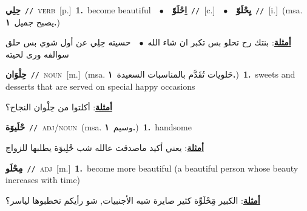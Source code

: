 \documentclass[10pt,a4paper,twoside]{article} %
\begin{document}
\begin{multicols}{2}
{\setlength\topsep{0pt}\textbf{\foreignlanguage{arabic}{حِلِي}}\ {\color{gray}\texttt{//}\color{black}}\ \textsc{verb}\ [p.]\ \textbf{1.}~become beautiful\ \ $\bullet$\ \ \setlength\topsep{0pt}\textbf{\foreignlanguage{arabic}{اِحْلَوّ}}\ {\color{gray}\texttt{//}\color{black}}\ [c.]\ \ $\bullet$\ \ \setlength\topsep{0pt}\textbf{\foreignlanguage{arabic}{يِحْلَوّ}}\ {\color{gray}\texttt{//}\color{black}}\ [i.]\ \color{gray}(msa. \foreignlanguage{arabic}{يصبح جميل}~\foreignlanguage{arabic}{\textbf{١.}})\color{black}\  \begin{flushright}\color{gray}\foreignlanguage{arabic}{\textbf{\underline{\foreignlanguage{arabic}{أمثلة}}}: بنتك رح تحلو بس تكبر ان شاء الله\ $\bullet$\ \  حسيته حِلِي عن أول شوي بس حلق سوالفه ورى لحيته}\end{flushright}\color{black}} \vspace{2mm}

{\setlength\topsep{0pt}\textbf{\foreignlanguage{arabic}{حِلْوَان}}\ {\color{gray}\texttt{//}\color{black}}\ \textsc{noun}\ [m.]\ \color{gray}(msa. \foreignlanguage{arabic}{حَلويات تُقَدَّم بالمناسبات السعيدة}~\foreignlanguage{arabic}{\textbf{١.}})\color{black}\ \textbf{1.}~sweets and desserts that are served on special happy occasions\  \begin{flushright}\color{gray}\foreignlanguage{arabic}{\textbf{\underline{\foreignlanguage{arabic}{أمثلة}}}: أكلتوا من حِلْوان النجاح؟}\end{flushright}\color{black}} \vspace{2mm}

{\setlength\topsep{0pt}\textbf{\foreignlanguage{arabic}{حْلَيوَة}}\ {\color{gray}\texttt{//}\color{black}}\ \textsc{adj/noun}\ \color{gray}(msa. \foreignlanguage{arabic}{وسيم}~\foreignlanguage{arabic}{\textbf{١.}})\color{black}\ \textbf{1.}~handsome\  \begin{flushright}\color{gray}\foreignlanguage{arabic}{\textbf{\underline{\foreignlanguage{arabic}{أمثلة}}}: يعني أكيد ماصدقت عالله شب حْلِيوَة يطلبها للزواج}\end{flushright}\color{black}} \vspace{2mm}

{\setlength\topsep{0pt}\textbf{\foreignlanguage{arabic}{مِحْلَو}}\ {\color{gray}\texttt{//}\color{black}}\ \textsc{adj}\ [m.]\ \textbf{1.}~become more beautiful (a beautiful person whose beauty increases with time)\  \begin{flushright}\color{gray}\foreignlanguage{arabic}{\textbf{\underline{\foreignlanguage{arabic}{أمثلة}}}: الكبير مَِحْلَوِّة كثير صايرة شبه الأجنبيات, شو رأيكم تخطبوها لياسر؟}\end{flushright}\color{black}} \vspace{2mm}


\end{multicols}
\end{document}
